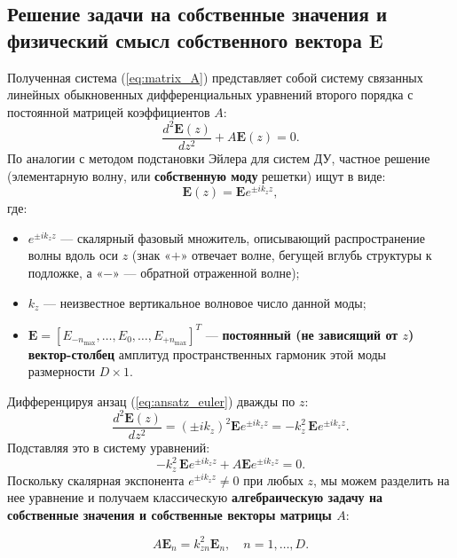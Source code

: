 \documentclass[a4paper,11pt]{article}
\begin{document}
\subsection{Решение задачи на собственные значения и физический смысл собственного вектора \texorpdfstring{$\mathbf{E}$}{E}}

Полученная система (\ref{eq:matrix_A}) представляет собой систему связанных линейных обыкновенных дифференциальных уравнений второго порядка с постоянной матрицей коэффициентов $A$:
\begin{equation}
    \frac{d^2 \mathbf{E}(z)}{dz^2} + A \mathbf{E}(z) = 0.
\end{equation}
По аналогии с методом подстановки Эйлера для систем ДУ, частное решение (элементарную волну, или \textbf{собственную моду} решетки) ищут в виде:
\begin{equation}
    \mathbf{E}(z) = \mathbf{E} e^{\pm i k_z z},
    \label{eq:ansatz_euler}
\end{equation}
где:
\begin{itemize}
    \item $e^{\pm i k_z z}$ — скалярный фазовый множитель, описывающий распространение волны вдоль оси $z$ (знак «$+$» отвечает волне, бегущей вглубь структуры к подложке, а «$-$» — обратной отраженной волне);
    \item $k_z$ — неизвестное вертикальное волновое число данной моды;
    \item $\mathbf{E} = [E_{-n_{\max}}, \dots, E_{0}, \dots, E_{+n_{\max}}]^T$ — \textbf{постоянный (не зависящий от $z$) вектор-столбец} амплитуд пространственных гармоник этой моды размерности $D \times 1$.
\end{itemize}

Дифференцируя анзац (\ref{eq:ansatz_euler}) дважды по $z$:
\begin{equation}
    \frac{d^2 \mathbf{E}(z)}{dz^2} = (\pm i k_z)^2 \mathbf{E} e^{\pm i k_z z} = - k_z^2 \, \mathbf{E} e^{\pm i k_z z}.
\end{equation}
Подставляя это в систему уравнений:
\begin{equation}
    - k_z^2 \, \mathbf{E} e^{\pm i k_z z} + A \mathbf{E} e^{\pm i k_z z} = 0.
\end{equation}
Поскольку скалярная экспонента $e^{\pm i k_z z} \ne 0$ при любых $z$, мы можем разделить на нее уравнение и получаем классическую \textbf{алгебраическую задачу на собственные значения и собственные векторы матрицы $A$}:
\begin{mathbox}
\begin{equation}
    A \mathbf{E}_n = k_{zn}^2 \mathbf{E}_n, \quad n = 1, \dots, D.
    \label{eq:eigenvalue_problem}
\end{equation}
\end{mathbox}
\end{document}
